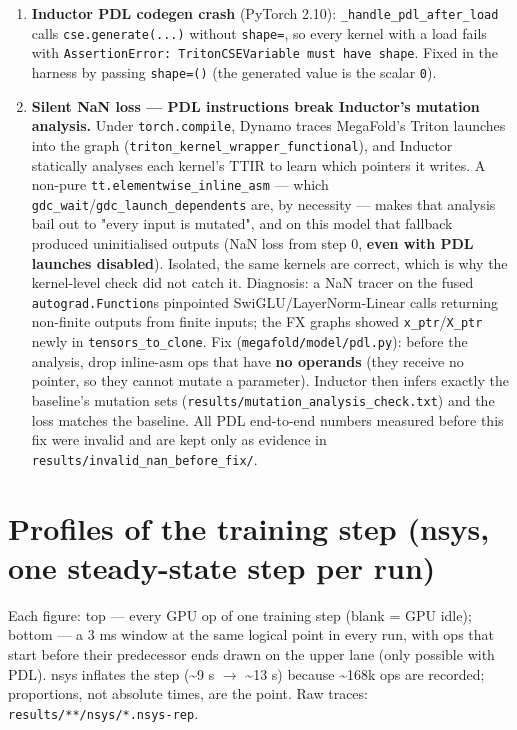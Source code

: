 \documentclass[10pt]{article}
\begin{document}
\begin{enumerate}
\item \textbf{Inductor PDL codegen crash} (PyTorch 2.10): \texttt{\_handle\_pdl\_after\_load} calls \texttt{cse.generate(...)} without \texttt{shape=}, so every kernel with a load fails with \texttt{AssertionError: TritonCSEVariable must have shape}. Fixed in the harness by passing \texttt{shape=()} (the generated value is the scalar \texttt{0}).
\item \textbf{Silent NaN loss --- PDL instructions break Inductor's mutation analysis.} Under \texttt{torch.compile}, Dynamo traces MegaFold's Triton launches into the graph (\texttt{triton\_kernel\_wrapper\_functional}), and Inductor statically analyses each kernel's TTIR to learn which pointers it writes. A non-pure \texttt{tt.elementwise\_inline\_asm} --- which \texttt{gdc\_wait}/\texttt{gdc\_launch\_dependents} are, by necessity --- makes that analysis bail out to "every input is mutated", and on this model that fallback produced uninitialised outputs (NaN loss from step 0, \textbf{even with PDL launches disabled}). Isolated, the same kernels are correct, which is why the kernel-level check did not catch it. Diagnosis: a NaN tracer on the fused \texttt{autograd.Function}s pinpointed SwiGLU/LayerNorm-Linear calls returning non-finite outputs from finite inputs; the FX graphs showed \texttt{x\_ptr}/\texttt{X\_ptr} newly in \texttt{tensors\_to\_clone}. Fix (\texttt{megafold/model/pdl.py}): before the analysis, drop inline-asm ops that have \textbf{no operands} (they receive no pointer, so they cannot mutate a parameter). Inductor then infers exactly the baseline's mutation sets (\texttt{results/mutation\_analysis\_check.txt}) and the loss matches the baseline. All PDL end-to-end numbers measured before this fix were invalid and are kept only as evidence in \texttt{results/invalid\_nan\_before\_fix/}.
\end{enumerate}

\section{Profiles of the training step (nsys, one steady-state step per run)}

Each figure: top --- every GPU op of one training step (blank = GPU idle); bottom --- a 3 ms window at the same logical point in every run, with ops that start before their predecessor ends drawn on the upper lane (only possible with PDL). nsys inflates the step (\textasciitilde{}9 s $\rightarrow$ \textasciitilde{}13 s) because \textasciitilde{}168k ops are recorded; proportions, not absolute times, are the point. Raw traces: \texttt{results/**/nsys/*.nsys-rep}.
\end{document}
